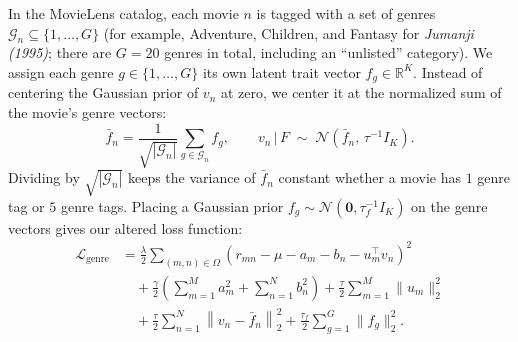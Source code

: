 \documentclass{article}
\theoremstyle{plain}
\theoremstyle{definition}
\begin{document}
In the MovieLens catalog, each movie $n$ is tagged with a set of genres $\mathcal{G}_n \subseteq \{1, \dots, G\}$ (for example, Adventure, Children, and Fantasy for \emph{Jumanji (1995)}; there are $G = 20$ genres in total, including an ``unlisted'' category). We assign each genre $g \in \{1, \dots, G\}$ its own latent trait vector $f_g \in \mathbb{R}^K$. Instead of centering the Gaussian prior of $v_n$ at zero, we center it at the normalized sum of the movie's genre vectors:
\begin{equation}
\bar{f}_n = \frac{1}{\sqrt{|\mathcal{G}_n|}} \sum_{g \in \mathcal{G}_n} f_g, \qquad v_n \,\big|\, F \;\sim\; \mathcal{N}\!\left(\bar{f}_n,\, \tau^{-1} I_K\right).
\label{eq:genre_prior_centroid}
\end{equation}
Dividing by $\sqrt{|\mathcal{G}_n|}$ keeps the variance of $\bar{f}_n$ constant whether a movie has $1$ genre tag or $5$ genre tags. Placing a Gaussian prior $f_g \sim \mathcal{N}(\mathbf{0}, \tau_f^{-1} I_K)$ on the genre vectors gives our altered loss function:
\begin{align}
\mathcal{L}_{\text{genre}} &= \frac{\lambda}{2} \!\sum_{(m,n) \in \Omega}\! \left(r_{mn} - \mu - a_m - b_n - u_m^\top v_n\right)^2 \nonumber \\
&\quad + \frac{\gamma}{2} \left( \sum_{m=1}^M a_m^2 + \sum_{n=1}^N b_n^2 \right) + \frac{\tau}{2} \sum_{m=1}^M \|u_m\|_2^2 \nonumber \\
&\quad + \frac{\tau}{2} \sum_{n=1}^N \left\| v_n - \bar{f}_n \right\|_2^2 + \frac{\tau_f}{2} \sum_{g=1}^G \|f_g\|_2^2.
\label{eq:genre_als_objective}
\end{align}
\end{document}
